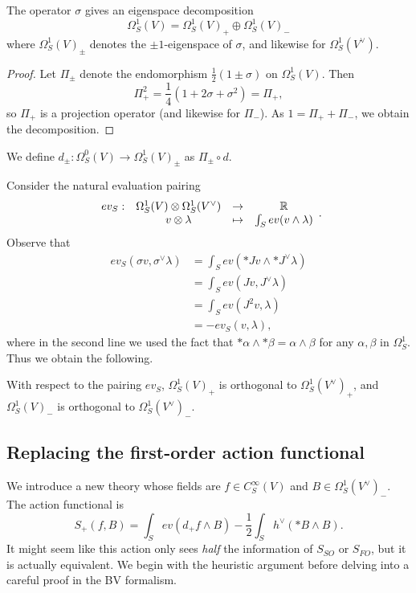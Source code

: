 \begin{lemma}
The operator $\sigma$ gives an eigenspace decomposition 
\[
\Omega^1_S(V) = \Omega^1_S(V)_+ \oplus \Omega^1_S(V)_-
\]
where $\Omega^1_S(V)_{\pm}$ denotes the $\pm 1$-eigenspace of $\sigma$, and likewise for $\Omega^1_S(V^\vee)$. 
\end{lemma}

\begin{proof}
Let $\Pi_{\pm}$ denote the endomorphism $\frac{1}{2}(1 \pm \sigma)$ on $\Omega^1_S(V)$. Then
\[
\Pi_+^2 = \frac{1}{4}(1 + 2 \sigma + \sigma^2) = \Pi_+,
\]
so $\Pi_+$ is a projection operator (and likewise for $\Pi_-$). As $1 = \Pi_+ + \Pi_-$, we obtain the decomposition.
\end{proof}

\begin{dfn}
We define $d_{\pm}: \Omega^0_S(V) \to \Omega^1_S(V)_{\pm}$ as $\Pi_{\pm} \circ d$. 
\end{dfn}

Consider the natural evaluation pairing
\[
\begin{array}{cccc}
ev_S: & \Omega^1_S(V) \otimes \Omega^1_S(V^\vee) & \to & \mathbb R \\
& v \otimes \lambda & \mapsto & \int_S ev(v \wedge \lambda)
\end{array}.
\]
Observe that
\begin{align*}
ev_S(\sigma v, \sigma^\vee \lambda) &= \int_S ev(\ast J v \wedge  \ast J^\vee \lambda) \\
&= \int_S ev(Jv, J^\vee \lambda) \\
&= \int_S ev(J^2 v, \lambda) \\
&= -ev_S(v,\lambda),
\end{align*}
where in the second line we used the fact that $\ast \alpha \wedge \ast \beta = \alpha \wedge \beta$ for any $\alpha, \beta$ in $\Omega^1_S$. Thus we obtain the following.

\begin{lemma}
With respect to the pairing $ev_S$, $\Omega^1_S(V)_+$ is orthogonal to $\Omega^1_S(V^\vee)_+$, and $\Omega^1_S(V)_-$ is orthogonal to $\Omega^1_S(V^\vee)_-$.
\end{lemma}

\subsection{Replacing the first-order action functional}

We introduce a new theory whose fields are $f \in C^\infty_S(V)$ and $B \in \Omega^1_S(V^\vee)_-$. The action functional is
\[
S_+(f,B) = \int_S ev(d_+f \wedge B) - \frac{1}{2} \int_S h^\vee(\ast B \wedge B).
\]
It might seem like this action only sees {\em half} the information of $S_{SO}$ or $S_{FO}$, but it is actually equivalent. We begin with the heuristic argument before delving into a careful proof in the BV formalism.

